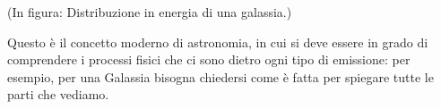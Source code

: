 (In figura: Distribuzione in energia di una galassia.)

Questo è il concetto moderno di astronomia, in cui si deve essere in grado di comprendere i processi fisici che ci sono dietro ogni tipo di emissione: per esempio, per una Galassia bisogna chiedersi come è fatta per spiegare tutte le parti che vediamo.